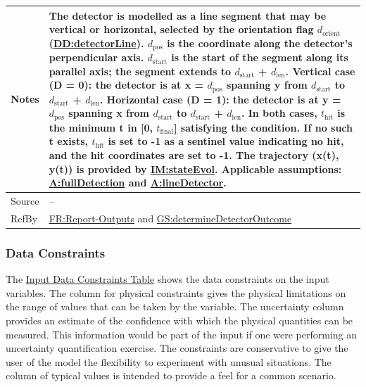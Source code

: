 \documentclass[12pt]{article}
\begin{document}
\begin{minipage}{\textwidth}
\begin{tabular}{>{\raggedright}p{}>{\raggedright\arraybackslash}p{}}
Notes & The detector is modelled as a line segment that may be vertical or horizontal, selected by the orientation flag ${d_{\text{orient}}}$ (\hyperref[DD:detectorLine]{DD:detectorLine}). ${d_{\text{pos}}}$ is the coordinate along the detector's perpendicular axis. ${d_{\text{start}}}$ is the start of the segment along its parallel axis; the segment extends to ${d_{\text{start}}}$ + ${d_{\text{len}}}$. Vertical case (D = 0): the detector is at x = ${d_{\text{pos}}}$ spanning y from ${d_{\text{start}}}$ to ${d_{\text{start}}}$ + ${d_{\text{len}}}$. Horizontal case (D = 1): the detector is at y = ${d_{\text{pos}}}$ spanning x from ${d_{\text{start}}}$ to ${d_{\text{start}}}$ + ${d_{\text{len}}}$. In both cases, ${t_{\text{hit}}}$ is the minimum t in [0, ${t_{\text{final}}}$] satisfying the condition. If no such t exists, ${t_{\text{hit}}}$ is set to -1 as a sentinel value indicating no hit, and the hit coordinates are set to -1. The trajectory (x(t), y(t)) is provided by \hyperref[IM:stateEvol]{IM:stateEvol}. Applicable assumptions: \hyperref[fullDetection]{A:fullDetection} and \hyperref[lineDetector]{A:lineDetector}.
        
\\ \midrule
Source & --
         
\\ \midrule
RefBy & \hyperref[reportOutputs]{FR:Report-Outputs} and \hyperref[determineDetectorOutcome]{GS:determineDetectorOutcome}
        
\\ \bottomrule
\end{tabular}
\end{minipage}

\subsubsection{Data Constraints}
\label{Sec:DataConstraints}
The \hyperref[Table:InDataConstraints]{Input Data Constraints Table} shows the data constraints on the input variables. The column for physical constraints gives the physical limitations on the range of values that can be taken by the variable. The uncertainty column provides an estimate of the confidence with which the physical quantities can be measured. This information would be part of the input if one were performing an uncertainty quantification exercise. The constraints are conservative to give the user of the model the flexibility to experiment with unusual situations. The column of typical values is intended to provide a feel for a common scenario.
\end{document}
